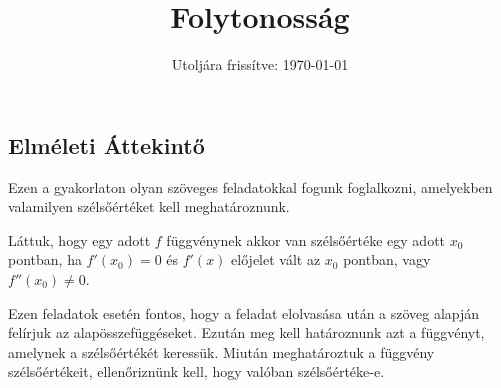 \documentclass[a4paper, 12pt]{scrartcl}
\title{Folytonosság}
\date{Utoljára frissítve: \today}
\begin{document}
\maketitle

\subsection{Elméleti Áttekintő}

\begin{blueBox}

  Ezen a gyakorlaton olyan szöveges feladatokkal fogunk foglalkozni, amelyekben
  valamilyen szélsőértéket kell meghatároznunk.

  Láttuk, hogy egy adott $f$ függvénynek akkor van szélsőértéke egy adott $x_0$
  pontban, ha $f'(x_0) = 0$ és $f'(x)$ előjelet vált az $x_0$ pontban, vagy
  $f''(x_0) \neq 0$.

  Ezen feladatok esetén fontos, hogy a feladat elolvasása után a szöveg alapján
  felírjuk az alapösszefüggéseket. Ezután meg kell határoznunk azt a függvényt,
  amelynek a szélsőértékét keressük. Miután meghatároztuk a függvény
  szélsőértékeit, ellenőriznünk kell, hogy valóban szélsőértéke-e.


\end{blueBox}
\end{document}
